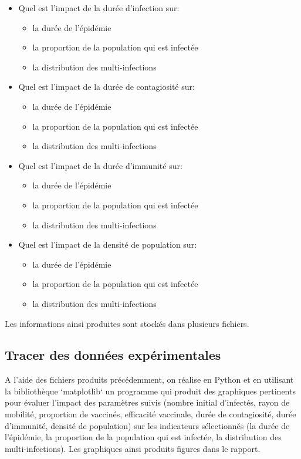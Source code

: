 \documentclass[a4paper, 11pt]{article}
\begin{document}
\begin{itemize}
				\item Quel est l'impact de la durée d'infection sur:
				\begin{itemize}
					\item la durée de l'épidémie
					\item la proportion de la population qui est infectée
					\item la distribution des multi-infections
				\end{itemize}
				
				\item Quel est l'impact de la durée de contagiosité sur:
				\begin{itemize}
					\item la durée de l'épidémie
					\item la proportion de la population qui est infectée
					\item la distribution des multi-infections
				\end{itemize}
				
				\item Quel est l'impact de la durée d'immunité sur:
				\begin{itemize}
					\item la durée de l'épidémie
					\item la proportion de la population qui est infectée
					\item la distribution des multi-infections
				\end{itemize}
				
				\item Quel est l'impact de la densité de population sur:
				\begin{itemize}
					\item la durée de l'épidémie
					\item la proportion de la population qui est infectée
					\item la distribution des multi-infections
				\end{itemize}
			\end{itemize}

			Les informations ainsi produites sont stockés dans plusieurs fichiers.


		\subsection{Tracer des données expérimentales}

			A l'aide des fichiers produits précédemment, on réalise en Python et en utilisant la bibliothèque `matplotlib` un programme qui produit des graphiques pertinents pour évaluer l'impact des paramètres suivis (nombre initial d'infectés, rayon de mobilité, proportion de vaccinés, efficacité vaccinale, durée de contagiosité, durée d'immunité, densité de population) sur les indicateurs sélectionnés (la durée de l'épidémie, la proportion de la population qui est infectée, la distribution des multi-infections). Les graphiques ainsi produits figures dans le rapport.
\end{document}
